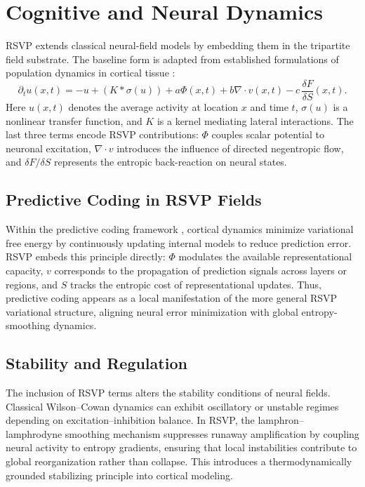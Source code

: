 \documentclass[12pt]{article}
\begin{document}
\section{Cognitive and Neural Dynamics}

RSVP extends classical neural-field models by embedding them in the tripartite field substrate. The baseline form is adapted from established formulations of population dynamics in cortical tissue \cite{Amari1977,Wilson:1972wza,Deco:2008zz}:
\begin{equation}
\partial_t u(x,t) = -u + (K\ast\sigma(u)) + a\Phi(x,t) + b\nabla\cdot v(x,t) - c\,\frac{\delta F}{\delta S}(x,t).
\end{equation}
Here $u(x,t)$ denotes the average activity at location $x$ and time $t$, $\sigma(u)$ is a nonlinear transfer function, and $K$ is a kernel mediating lateral interactions. The last three terms encode RSVP contributions: $\Phi$ couples scalar potential to neuronal excitation, $\nabla\cdot v$ introduces the influence of directed negentropic flow, and $\delta F/\delta S$ represents the entropic back-reaction on neural states.

\subsection{Predictive Coding in RSVP Fields}
Within the predictive coding framework \cite{Friston:2009ze,ParrPezzuloFriston2022}, cortical dynamics minimize variational free energy by continuously updating internal models to reduce prediction error. RSVP embeds this principle directly: $\Phi$ modulates the available representational capacity, $v$ corresponds to the propagation of prediction signals across layers or regions, and $S$ tracks the entropic cost of representational updates. Thus, predictive coding appears as a local manifestation of the more general RSVP variational structure, aligning neural error minimization with global entropy-smoothing dynamics.

\subsection{Stability and Regulation}
The inclusion of RSVP terms alters the stability conditions of neural fields. Classical Wilson–Cowan dynamics can exhibit oscillatory or unstable regimes depending on excitation–inhibition balance. In RSVP, the lamphron–lamphrodyne smoothing mechanism suppresses runaway amplification by coupling neural activity to entropy gradients, ensuring that local instabilities contribute to global reorganization rather than collapse. This introduces a thermodynamically grounded stabilizing principle into cortical modeling.
\end{document}
